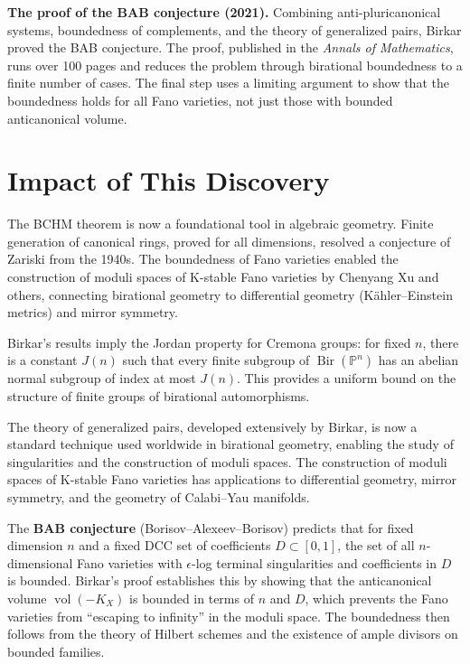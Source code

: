 \textbf{The proof of the BAB conjecture (2021).} Combining anti-pluricanonical systems, boundedness of complements, and the theory of generalized pairs, Birkar proved the BAB conjecture. The proof, published in the \emph{Annals of Mathematics}, runs over 100 pages and reduces the problem through birational boundedness to a finite number of cases. The final step uses a limiting argument to show that the boundedness holds for all Fano varieties, not just those with bounded anticanonical volume.

\section{Impact of This Discovery}

The BCHM theorem is now a foundational tool in algebraic geometry. Finite generation of canonical rings, proved for all dimensions, resolved a conjecture of Zariski from the 1940s. The boundedness of Fano varieties enabled the construction of moduli spaces of K-stable Fano varieties by Chenyang Xu and others, connecting birational geometry to differential geometry (K\"ahler--Einstein metrics) and mirror symmetry.

Birkar's results imply the Jordan property for Cremona groups: for fixed $n$, there is a constant $J(n)$ such that every finite subgroup of $\operatorname{Bir}(\mathbb{P}^n)$ has an abelian normal subgroup of index at most $J(n)$. This provides a uniform bound on the structure of finite groups of birational automorphisms.

The theory of generalized pairs, developed extensively by Birkar, is now a standard technique used worldwide in birational geometry, enabling the study of singularities and the construction of moduli spaces. The construction of moduli spaces of K-stable Fano varieties has applications to differential geometry, mirror symmetry, and the geometry of Calabi--Yau manifolds.

The \textbf{BAB conjecture} (Borisov--Alexeev--Borisov) predicts that for fixed dimension $n$ and a fixed DCC set of coefficients $D \subset [0,1]$, the set of all $n$-dimensional Fano varieties with $\epsilon$-log terminal singularities and coefficients in $D$ is bounded. Birkar's proof establishes this by showing that the anticanonical volume $\operatorname{vol}(-K_X)$ is bounded in terms of $n$ and $D$, which prevents the Fano varieties from ``escaping to infinity'' in the moduli space. The boundedness then follows from the theory of Hilbert schemes and the existence of ample divisors on bounded families.

